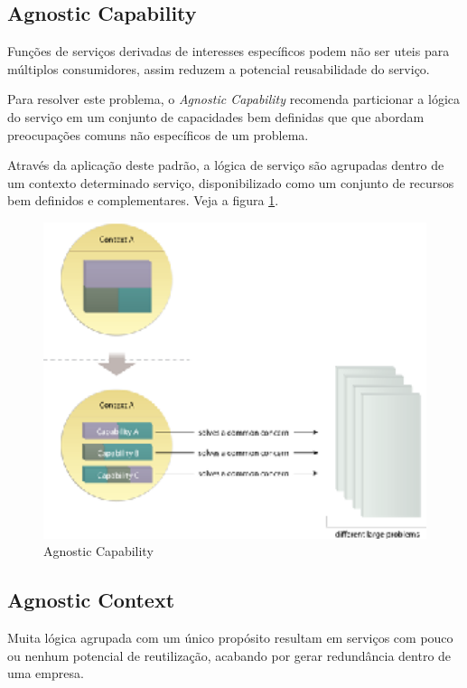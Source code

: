 \documentclass[12pt]{article}
\begin{document}
\subsection{Agnostic Capability}

Funções de serviços derivadas de interesses específicos podem não ser uteis para múltiplos consumidores, assim reduzem a potencial reusabilidade do serviço.

Para resolver este problema, o \textit{Agnostic Capability} recomenda particionar a lógica do serviço em um conjunto de capacidades bem definidas que que abordam preocupações comuns não específicos de um problema.

Através da aplicação deste padrão, a lógica de serviço são agrupadas dentro de um contexto determinado serviço, disponibilizado como um conjunto de recursos bem definidos e complementares. Veja a figura \ref{fig:1}.

\begin{figure}[H]
\centering
\includegraphics[width=14cm]{img/fig1.eps}
\caption{Agnostic Capability}
\label{fig:1}
\end{figure}

\subsection{Agnostic Context}

Muita lógica agrupada com um único propósito resultam em serviços com pouco ou nenhum potencial de reutilização, acabando por gerar redundância dentro de uma empresa.
\end{document}
